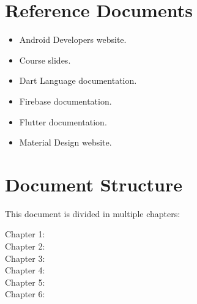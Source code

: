 \section{Reference Documents}
\begin{itemize}
    \item Android Developers website.
    \item Course slides.
    \item Dart Language documentation.
    \item Firebase documentation.
    \item Flutter documentation.
    \item Material Design website. 
\end{itemize}

\section{Document Structure}
This document is divided in multiple chapters:
\begin{description}
    \item[Chapter 1:] 
    \item[Chapter 2:] 
    \item[Chapter 3:] 
    \item[Chapter 4:] 
    \item[Chapter 5:] 
    \item[Chapter 6:] 
\end{description}